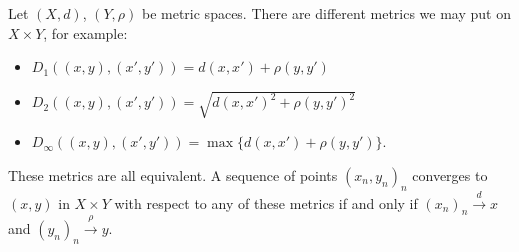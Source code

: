     \begin{example}
        Let $(X,d)$, $(Y,\rho)$ be metric spaces. There are different metrics we may put on $X \times Y$, for example:
            \begin{itemize}
                \item $D_1((x,y),(x',y')) = d(x,x') + \rho(y,y')$ 
                \item $D_2((x,y),(x',y')) = \sqrt{d(x,x')^2 + \rho(y,y')^2}$
                \item $D_\infty((x,y),(x',y')) = \max\{d(x,x') + \rho(y,y')\}$.
            \end{itemize}
        These metrics are all equivalent. A sequence of points $(x_n,y_n)_n$ converges to $(x,y)$ in $X \times Y$ with respect to any of these metrics if and only if $(x_n)_n \xrightarrow{d} x$ and $(y_n)_n \xrightarrow{\rho} y$.
    \end{example}
    \fi

    \begin{center}
    \end{center}

